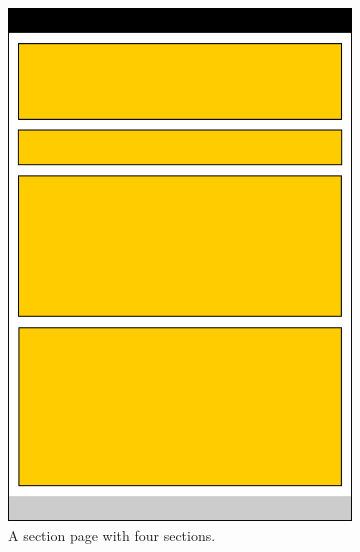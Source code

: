 \documentclass[a4paper,oneside]{book}
\begin{document}
\begin{figure}[ht]
    \centering
    \begin{subfigure}[t]{0.22\textwidth}
        \includegraphics[width=\textwidth]{section_page.png}
        \caption{A section page with four sections.}
        \label{fig.section_page}
    \end{subfigure}
    ~
    \begin{subfigure}[t]{0.22\textwidth}

\end{subfigure}
\end{figure}
\end{document}
